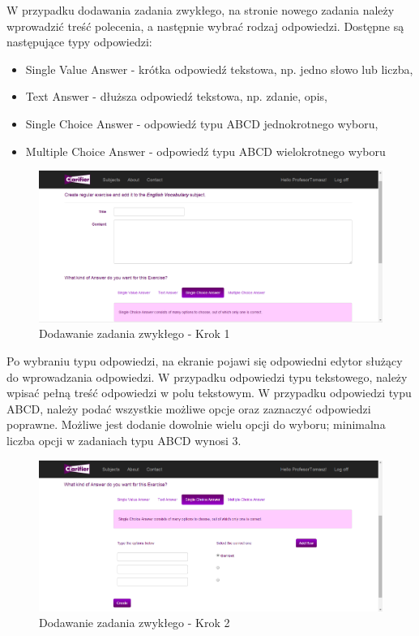 \documentclass{pracamgr}
\begin{document}
\newpage
W przypadku dodawania zadania zwykłego, na stronie nowego zadania należy wprowadzić treść polecenia, a następnie wybrać rodzaj odpowiedzi. Dostępne są następujące typy odpowiedzi:
\begin{itemize}
\item Single Value Answer - krótka odpowiedź tekstowa, np. jedno słowo lub liczba,
\item Text Answer - dłuższa odpowiedź tekstowa, np. zdanie, opis,
\item Single Choice Answer - odpowiedź typu ABCD jednokrotnego wyboru,
\item Multiple Choice Answer - odpowiedź typu ABCD wielokrotnego wyboru
\end{itemize} 

\begin{figure}[h]
    \centering
    \includegraphics[width=1.0\textwidth]{Web_regular_exercise_1.png}
    \caption{Dodawanie zadania zwykłego - Krok 1}
    \label{fig:web_regular_exercise_1}
\end{figure}

Po wybraniu typu odpowiedzi, na ekranie pojawi się odpowiedni edytor służący do wprowadzania odpowiedzi. W przypadku odpowiedzi typu tekstowego, należy wpisać pełną treść odpowiedzi w polu tekstowym. W przypadku odpowiedzi typu ABCD, należy podać wszystkie możliwe opcje oraz zaznaczyć odpowiedzi poprawne. Możliwe jest dodanie dowolnie wielu opcji do wyboru; minimalna liczba opcji w zadaniach typu ABCD wynosi 3. 

\begin{figure}[h]
    \centering
    \includegraphics[width=1.0\textwidth]{Web_regular_exercise_2.png}
    \caption{Dodawanie zadania zwykłego - Krok 2}
    \label{fig:web_regular_exercise_2}
\end{figure}
\end{document}
